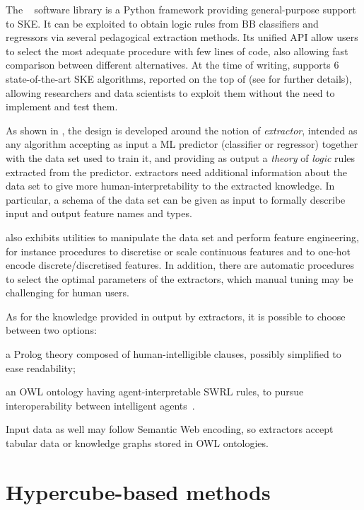 \documentclass[
]{ceurart}
\begin{document}
The \psyke{}~\cite{psyke-woa2021,psyke-ia2022} software library is a Python framework providing general-purpose support to SKE.
%
It can be exploited to obtain logic rules from BB classifiers and regressors via several pedagogical extraction methods.
%
Its unified API allow users to select the most adequate procedure with few lines of code, also allowing fast comparison between different alternatives.
%
At the time of writing, \psyke{} supports 6 state-of-the-art SKE algorithms, reported on the top of  (see  for further details), allowing researchers and data scientists to exploit them without the need to implement and test them.

As shown in , the \psyke{} design is developed around the notion of \emph{extractor}, intended as any algorithm accepting as input a ML predictor (classifier or regressor) together with the data set used to train it, and providing as output a \emph{theory} of \emph{logic} rules extracted from the predictor.
%
\psyke{} extractors need additional information about the data set to give more human-interpretability to the extracted knowledge.
In particular, a schema of the data set can be given as input to formally describe input and output feature names and types.

\psyke{} also exhibits utilities to manipulate the data set and perform feature engineering, for instance procedures to discretise or scale continuous features and to one-hot encode discrete/discretised features.
%
In addition, there are automatic procedures to select the optimal parameters of the extractors, which manual tuning may be challenging for human users.

As for the knowledge provided in output by extractors, it is possible to choose between two options:
\begin{inlinelist}
	\item a Prolog theory composed of human-intelligible clauses, possibly simplified to ease readability;
	\item an OWL ontology having agent-interpretable SWRL rules, to pursue interoperability between intelligent agents~\cite{psyke-extraamas2022}.
\end{inlinelist}
%
Input data as well may follow Semantic Web encoding, so \psyke{} extractors accept tabular data or knowledge graphs stored in OWL ontologies.

\section{Hypercube-based methods}\label{sec:contribution}
\end{document}
